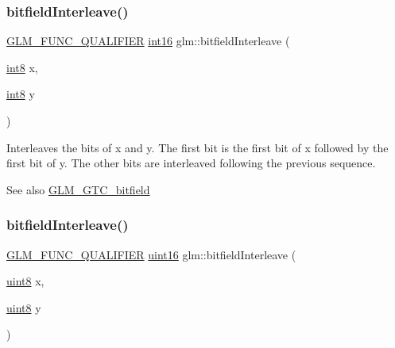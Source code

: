 \subsubsection{\texorpdfstring{bitfield\+Interleave()}{bitfieldInterleave()}\hspace{0.1cm}{\footnotesize\ttfamily [1/16]}}
{\footnotesize\ttfamily \hyperlink{setup_8hpp_a33fdea6f91c5f834105f7415e2a64407}{G\+L\+M\+\_\+\+F\+U\+N\+C\+\_\+\+Q\+U\+A\+L\+I\+F\+I\+ER} \hyperlink{group__gtc__type__precision_ga2945a61d12771f8954994fcddf02b021}{int16} glm\+::bitfield\+Interleave (\begin{DoxyParamCaption}\item[{\hyperlink{group__gtc__type__precision_ga96254f9c1c4506fc8eb5cf3301ce8565}{int8}}]{x,  }\item[{\hyperlink{group__gtc__type__precision_ga96254f9c1c4506fc8eb5cf3301ce8565}{int8}}]{y }\end{DoxyParamCaption})}

Interleaves the bits of x and y. The first bit is the first bit of x followed by the first bit of y. The other bits are interleaved following the previous sequence.

\begin{DoxySeeAlso}{See also}
\hyperlink{group__gtc__bitfield}{G\+L\+M\+\_\+\+G\+T\+C\+\_\+bitfield} 
\end{DoxySeeAlso}
\mbox{\label{group__gtc__bitfield_ga0700a3ceb088a0ecc23d76c154096061}} 
\subsubsection{\texorpdfstring{bitfield\+Interleave()}{bitfieldInterleave()}\hspace{0.1cm}{\footnotesize\ttfamily [2/16]}}
{\footnotesize\ttfamily \hyperlink{setup_8hpp_a33fdea6f91c5f834105f7415e2a64407}{G\+L\+M\+\_\+\+F\+U\+N\+C\+\_\+\+Q\+U\+A\+L\+I\+F\+I\+ER} \hyperlink{group__gtc__type__precision_gad8c2939e1fdd8e5828b31d95c52255d5}{uint16} glm\+::bitfield\+Interleave (\begin{DoxyParamCaption}\item[{\hyperlink{group__gtc__type__precision_ga1a7dcd8aac97cc8020817c94049deff2}{uint8}}]{x,  }\item[{\hyperlink{group__gtc__type__precision_ga1a7dcd8aac97cc8020817c94049deff2}{uint8}}]{y }\end{DoxyParamCaption})}

